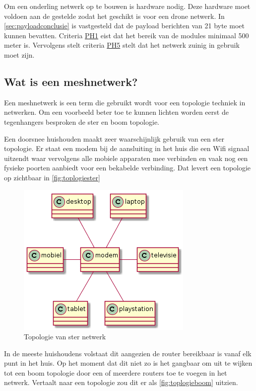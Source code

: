 \documentclass[a4paper, 11pt, oneside]{report}
\begin{document}
Om een onderling netwerk op te bouwen is hardware nodig. 
Deze hardware moet voldoen aan de gestelde  zodat het geschikt is voor een drone netwerk.
In \autoref{sec:payloadconclusie} is vastgesteld dat de payload berichten van 21 byte moet kunnen bevatten.
Criteria \hyperlink{ph1}{PH1} eist dat het bereik van de modules minimaal 500 meter is.
Vervolgens stelt criteria \hyperlink{ph5}{PH5} stelt dat het netwerk zuinig in gebruik moet zijn. 
\subsection{Wat is een meshnetwerk?}
\label{sec:meshnetwerkkeuze:watismesh}
Een meshnetwerk is een term die gebruikt wordt voor een topologie techniek in netwerken.
Om een voorbeeld beter toe te kunnen lichten worden eerst de tegenhangers besproken de ster en boom topologie.

Een doorsnee huishouden maakt zeer waarschijnlijk gebruik van een ster topologie.
Er staat een modem bij de aansluiting in het huis die een Wifi signaal uitzendt waar vervolgens alle mobiele apparaten mee verbinden en vaak nog een fysieke poorten aanbiedt voor een bekabelde verbinding.
Dat levert een topologie op zichtbaar in \autoref{fig:toplogiester}

\begin{figure}[H]
	\begin{center}\includegraphics[width=.4\linewidth]{sterTopo}\end{center}
	\caption{Topologie van ster netwerk}
	\label{fig:toplogiester}
\end{figure}

In de meeste huishoudens volstaat dit aangezien de router bereikbaar is vanaf elk punt in het huis.
Op het moment dat dit niet zo is het gangbaar om uit te wijken tot een boom topologie door een of meerdere routers toe te voegen in het netwerk.
Vertaalt naar een topologie zou dit er als \autoref{fig:toplogieboom} uitzien.
\end{document}
